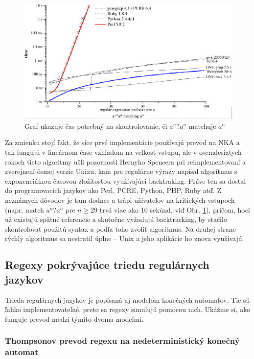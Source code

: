 \begin{figure}[h]
  \centering
  \includegraphics[width=1\textwidth]{obrazky/graf}
  \caption{Graf ukazuje čas potrebný na skontrolovanie, či $a^n?a^n$ matchuje $a^n$}
  \label{fig:graf}
\end{figure}
Za zmienku stojí fakt, že síce prvé implementácie používajú prevod na NKA a tak fungujú v lineárnom čase vzhľadom na veľkosť vstupu, ale v osemdesiatych rokoch tieto algoritmy ušli pozornosti Hernyho Spencera pri reimplementovaní a zverejnení ôsmej verzie Unixu, kam pre regulárne výrazy napísal algoritmus s exponenciálnou časovou zložitosťou využívajúci backtraking. Práve ten sa dostal do programovacích jazykov ako Perl, PCRE, Python, PHP, Ruby atď. Z neznámych dôvodov je tam dodnes a trápi užívateľov na kritických vstupoch (napr. match $a^n?a^n$ pre $n \geq 29$ trvá viac ako 10 sekúnd, viď Obr. \ref{fig:graf}), pričom, hoci už existujú spätné referencie a skutočne vyžadujú backtracking, by stačilo skontrolovať použitú syntax a podľa toho zvoliť algoritmus. Na druhej strane rýchly algoritmus sa nestratil úplne -- Unix a jeho aplikácie ho znova využívajú.

\subsection*{Regexy pokrývajúce triedu regulárnych jazykov}
\label{praxregex}

Trieda regulárnych jazykov je popísaná aj modelom konečných automatov. Tie sú ľahko implementovateľné, preto sa regexy simulujú pomocou nich. Ukážme si, ako funguje prevod medzi týmito dvoma modelmi.

\subsubsection{Thompsonov prevod regexu na nedeterministický konečný automat \cite{Cox07SlowPython}}

